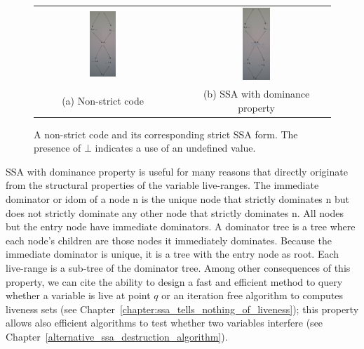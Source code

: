 \begin{figure}
\begin{tabular}{cp{1cm}c}
\includegraphics[width=0.2\textwidth]{double-diamond-a.pdf} &&
\includegraphics[width=0.2\textwidth]{double-diamond-b.pdf}\\
(a) Non-strict code &&
(b) SSA with dominance property
\end{tabular}
\caption{\label{fig:properties_and_flavors:dom_property}A non-strict code and its corresponding strict SSA form. The presence of $\bot$ indicates a use of an undefined value.}
\end{figure}


SSA with dominance property is useful for many reasons that directly originate from the structural properties of the variable live-ranges. 
The immediate dominator or idom of a node n is the unique node that strictly dominates n but does not strictly dominate any other node that strictly dominates n. All nodes but the entry node have immediate dominators. A dominator tree is a tree where each node's children are those nodes it immediately dominates. Because the immediate dominator is unique, it is a tree with the entry node as root. Each live-range is a sub-tree of the dominator tree. 
Among other consequences of this property, we can cite the ability to design a fast and efficient method to query whether a variable is live at point $q$ or an iteration free algorithm to computes liveness sets (see Chapter~\ref{chapter:ssa_tells_nothing_of_liveness}); this property allows also efficient algorithms to test whether two variables interfere (see Chapter~\ref{alternative_ssa_destruction_algorithm}). 

